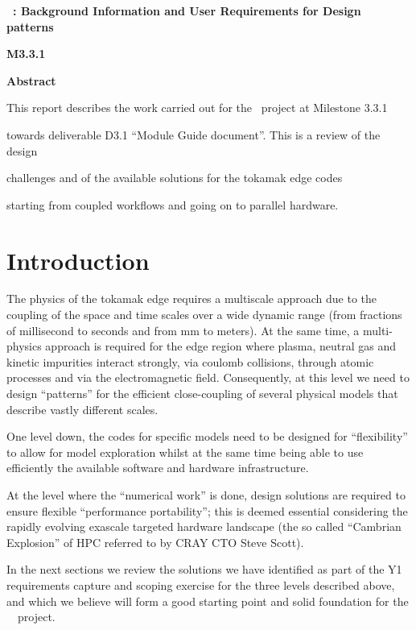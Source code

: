 \documentclass{article}
\begin{document}
{\huge{}{ \textbf{\nep \  : Background Information and User Requirements 
for Design patterns}}}

{\huge{}{ \textbf{M3.3.1}}}

\baselineskip=12pt
{ \textbf{Abstract}}

{ This report describes the work carried out for the \nep \   project 
at Milestone 3.3.1 }

{ towards deliverable D3.1 ``Module Guide document''. This is a 
review of the design }

{ challenges and of the available solutions for the tokamak edge 
codes }

{ starting from coupled workflows and going on to parallel hardware. 
\pagebreak{}}


\section*{{\Large{}{ \textbf{Introduction}}}}

\baselineskip=18pt
The physics of the tokamak edge requires a multiscale approach due to the coupling 
of the space and time scales over a wide dynamic range (from fractions of millisecond 
to seconds and from mm to meters).{  }{ At the same 
time, a }multi-physics approach is required for the edge region where plasma, neutral 
gas and kinetic impurities interact strongly, via coulomb collisions, through atomic 
processes and via the electromagnetic field. Consequently, at this level we need 
to design ``patterns'' for the efficient close-coupling of several physical models 
that describe vastly different scales.

One level down, the codes for specific models need to be designed for ``flexibility'' 
to allow for model exploration whilst at the same time being able to use efficiently 
the available software and hardware infrastructure.

At the level where the ``numerical work'' is done, design solutions are required 
to ensure flexible ``performance portability''; this is deemed essential considering 
the rapidly evolving exascale targeted hardware landscape (the so called ``Cambrian 
Explosion'' of HPC referred to by CRAY CTO Steve Scott).

In the next sections we review the solutions we have identified as part of the 
Y1 requirements capture and scoping exercise for the three levels described above, 
and which we believe will form a good starting point and solid foundation for the 
\exc \   \nep \   project.
\end{document}

